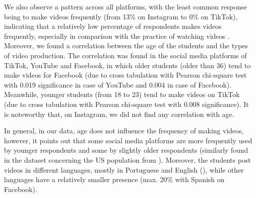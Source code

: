 We also observe a pattern across all platforms, with the least common
response being to make videos frequently (from 13\% on Instagram to 0\%
on TikTok), indicating that a relatively low percentage of respondents
makes videos frequently, especially in comparison with the practice of
watching videos \cite{shafirova2023}. Moreover, we found a
correlation between the age of the students and the types of video
production. The correlation was found in the social media platforms of
TikTok, YouTube and Facebook, in which older students (older than 36)
tend to make videos for Facebook (due to cross tabulation with Pearson
chi-square test with 0.019 significance in case of YouTube and 0.004 in
case of Facebook). Meanwhile, younger students (from 18 to 23) tend to
make videos on TikTok (due to cross tabulation with Pearson chi-square
test with 0.008 significance). It is noteworthy that, on Instagram, we
did not find any correlation with age.

In general, in our data, age does not influence the frequency of making
videos, however, it points out that some social media platforms are more
frequently used by younger respondents and some by slightly older
respondents (similarly found in the dataset concerning the US population
from \textcite{ortizo-spina2019}). Moreover, the students post videos in
different languages, mostly in Portuguese and English (), while
other languages have a relatively smaller presence (max. 20\% with
Spanish on Facebook).

